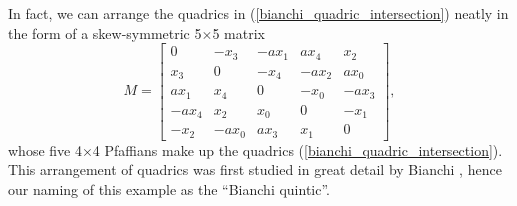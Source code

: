In fact, we can arrange the quadrics in (\ref{bianchi_quadric_intersection}) neatly in the form of a skew-symmetric 5$\times$5 matrix
\begin{equation*}
M=
	\begin{bmatrix}
	0 & -x_{3} & -a x_{1} & ax_{4} & x_{2} \\
	x_{3} & 0 & - x_{4} & -ax_{2} & ax_{0} \\
	ax_{1} & x_{4} & 0 & -x_{0} & -ax_{3} \\
	-ax_{4} & x_{2} & x_{0} & 0 & -x_{1} \\
	-x_{2} & -ax_{0} & ax_{3} & x_{1} & 0 
	\end{bmatrix},
\end{equation*}
whose five 4$\times$4 Pfaffians make up the quadrics (\ref{bianchi_quadric_intersection}). This arrangement of quadrics was first studied in great detail by Bianchi \cite{Bianchi_1880}, hence our naming of this example as the ``Bianchi quintic''.

